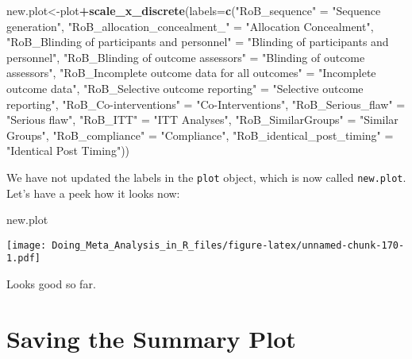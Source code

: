 \documentclass[]{book}
\newenvironment{Shaded}{\begin{snugshade}}{\end{snugshade}}
\newcommand{\KeywordTok}[1]{\textcolor[rgb]{0.13,0.29,0.53}{\textbf{#1}}}
\newcommand{\DataTypeTok}[1]{\textcolor[rgb]{0.13,0.29,0.53}{#1}}
\newcommand{\StringTok}[1]{\textcolor[rgb]{0.31,0.60,0.02}{#1}}
\newcommand{\OperatorTok}[1]{\textcolor[rgb]{0.81,0.36,0.00}{\textbf{#1}}}
\newcommand{\NormalTok}[1]{#1}
\theoremstyle{definition}
\theoremstyle{definition}
\theoremstyle{definition}
\theoremstyle{remark}
\begin{document}
\begin{Shaded}
\begin{Highlighting}[]
\NormalTok{new.plot<-plot}\OperatorTok{+}\KeywordTok{scale_x_discrete}\NormalTok{(}\DataTypeTok{labels=}\KeywordTok{c}\NormalTok{(}\StringTok{"RoB_sequence"}\NormalTok{ =}\StringTok{ "Sequence generation"}\NormalTok{,}
                            \StringTok{"RoB_allocation_concealment_"}\NormalTok{ =}\StringTok{ "Allocation Concealment"}\NormalTok{,}
                            \StringTok{"RoB_Blinding of participants and personnel"}\NormalTok{ =}\StringTok{ "Blinding of participants and personnel"}\NormalTok{,}
                            \StringTok{"RoB_Blinding of outcome assessors"}\NormalTok{ =}\StringTok{ "Blinding of outcome assessors"}\NormalTok{,}
                            \StringTok{"RoB_Incomplete outcome data for all outcomes"}\NormalTok{ =}\StringTok{ "Incomplete outcome data"}\NormalTok{,}
                            \StringTok{"RoB_Selective outcome reporting"}\NormalTok{ =}\StringTok{ "Selective outcome reporting"}\NormalTok{,}
                            \StringTok{"RoB_Co-interventions"}\NormalTok{ =}\StringTok{ "Co-Interventions"}\NormalTok{,}
                            \StringTok{"RoB_Serious_flaw"}\NormalTok{ =}\StringTok{ "Serious flaw"}\NormalTok{,}
                            \StringTok{"RoB_ITT"}\NormalTok{ =}\StringTok{ "ITT Analyses"}\NormalTok{,}
                            \StringTok{"RoB_SimilarGroups"}\NormalTok{ =}\StringTok{ "Similar Groups"}\NormalTok{,}
                            \StringTok{"RoB_compliance"}\NormalTok{ =}\StringTok{ "Compliance"}\NormalTok{,}
                            \StringTok{"RoB_identical_post_timing"}\NormalTok{ =}\StringTok{ "Identical Post Timing"}\NormalTok{))}
\end{Highlighting}
\end{Shaded}

We have not updated the labels in the \texttt{plot} object, which is now
called \texttt{new.plot}. Let's have a peek how it looks now:

\begin{Shaded}
\begin{Highlighting}[]
\NormalTok{new.plot}
\end{Highlighting}
\end{Shaded}

\texttt{[image: Doing\_Meta\_Analysis\_in\_R\_files/figure-latex/unnamed-chunk-170-1.pdf]}

Looks good so far.

\hypertarget{saving}{\section{Saving the Summary Plot}\label{saving}}
\end{document}
